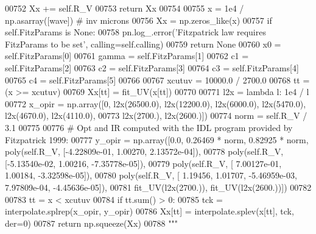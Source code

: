 \begin{DoxyVerb}
\begin{DoxyCode}
00752 \textcolor{stringliteral}{            Xx += self.R\_V}
00753 \textcolor{stringliteral}{            return Xx}
00754 \textcolor{stringliteral}{            }
00755 \textcolor{stringliteral}{        x = 1e4 / np.asarray([wave]) # inv microns}
00756 \textcolor{stringliteral}{        Xx = np.zeros\_like(x)}
00757 \textcolor{stringliteral}{        if self.FitzParams is None:}
00758 \textcolor{stringliteral}{            pn.log\_.error('Fitzpatrick law requires FitzParams to be set', calling=self.calling)}
00759 \textcolor{stringliteral}{            return None}
00760 \textcolor{stringliteral}{        x0 = self.FitzParams[0]}
00761 \textcolor{stringliteral}{        gamma = self.FitzParams[1]}
00762 \textcolor{stringliteral}{        c1 = self.FitzParams[2]}
00763 \textcolor{stringliteral}{        c2 = self.FitzParams[3]}
00764 \textcolor{stringliteral}{        c3 = self.FitzParams[4]}
00765 \textcolor{stringliteral}{        c4 = self.FitzParams[5]}
00766 \textcolor{stringliteral}{        }
00767 \textcolor{stringliteral}{        xcutuv = 10000.0 / 2700.0}
00768 \textcolor{stringliteral}{        tt = (x >= xcutuv) }
00769 \textcolor{stringliteral}{        Xx[tt] = fit\_UV(x[tt])}
00770 \textcolor{stringliteral}{        }
00771 \textcolor{stringliteral}{        l2x = lambda l: 1e4 / l}
00772 \textcolor{stringliteral}{        x\_opir = np.array([0, l2x(26500.0), l2x(12200.0), l2x(6000.0), l2x(5470.0), l2x(4670.0),
       l2x(4110.0),}
00773 \textcolor{stringliteral}{                  l2x(2700.), l2x(2600.)])}
00774 \textcolor{stringliteral}{        norm = self.R\_V / 3.1}
00775 \textcolor{stringliteral}{        }
00776 \textcolor{stringliteral}{        # Opt and IR computed with the IDL program provided by Fitzpatrick 1999:        }
00777 \textcolor{stringliteral}{        y\_opir = np.array([0.0, 0.26469 * norm, 0.82925 * norm, poly(self.R\_V, [-4.22809e-01, 1.00270,
       2.13572e-04]),}
00778 \textcolor{stringliteral}{                    poly(self.R\_V, [-5.13540e-02, 1.00216, -7.35778e-05]),}
00779 \textcolor{stringliteral}{                    poly(self.R\_V, [ 7.00127e-01, 1.00184, -3.32598e-05]),}
00780 \textcolor{stringliteral}{                    poly(self.R\_V, [ 1.19456, 1.01707, -5.46959e-03, 7.97809e-04, -4.45636e-05]),}
00781 \textcolor{stringliteral}{                    fit\_UV(l2x(2700.)), fit\_UV(l2x(2600.))])}
00782 \textcolor{stringliteral}{        }
00783 \textcolor{stringliteral}{        tt = x < xcutuv}
00784 \textcolor{stringliteral}{        if tt.sum() > 0:}
00785 \textcolor{stringliteral}{            tck = interpolate.splrep(x\_opir, y\_opir)}
00786 \textcolor{stringliteral}{            Xx[tt] = interpolate.splev(x[tt], tck, der=0)}
00787 \textcolor{stringliteral}{        return np.squeeze(Xx)}
00788 \textcolor{stringliteral}{        """}    
            

\end{DoxyCode}
\end{DoxyVerb}

